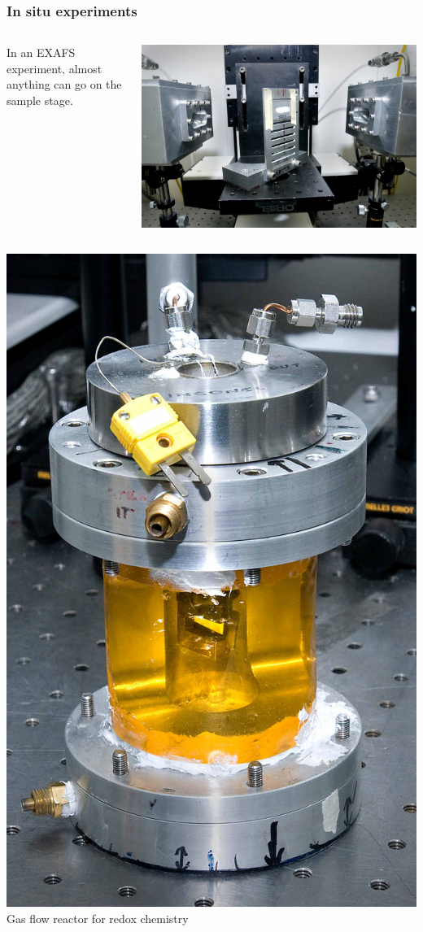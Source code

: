 \documentclass[10pt, xcolor=x11names, compress]{beamer}
\begin{document}
\begin{frame}
  \frametitle{In situ experiments}

  \begin{columns}
    \begin{column}{0.65\linewidth}
      In an EXAFS experiment, almost anything can go on the sample
      stage.
    \end{column}
    \begin{column}{0.35\linewidth}
      \includegraphics[width=0.8\linewidth]{exp/stage.jpg}
    \end{column}
  \end{columns}

  \scriptsize
  \begin{columns}[T]
    \begin{column}{0.25\linewidth}
      \begin{center}
        \includegraphics[width=0.54\linewidth]{exp/reactor.jpg}\\
        Gas flow reactor for redox chemistry


\end{center}
\end{column}
\end{columns}
\end{frame}
\end{document}
